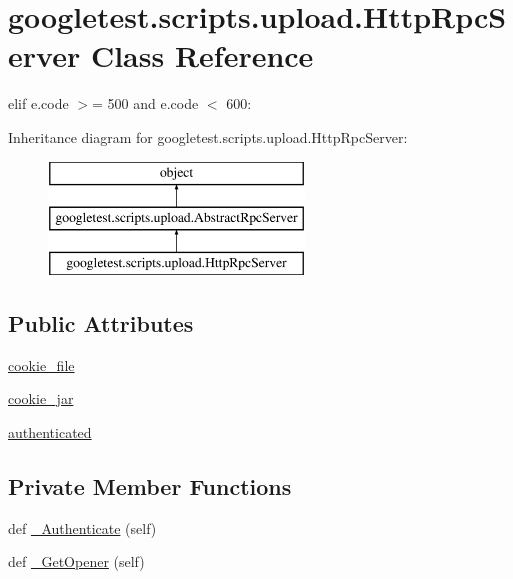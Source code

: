\hypertarget{classgoogletest_1_1scripts_1_1upload_1_1_http_rpc_server}{}\section{googletest.\+scripts.\+upload.\+Http\+Rpc\+Server Class Reference}
\label{classgoogletest_1_1scripts_1_1upload_1_1_http_rpc_server}


elif e.\+code $>$= 500 and e.\+code $<$ 600\+:  


Inheritance diagram for googletest.\+scripts.\+upload.\+Http\+Rpc\+Server\+:\begin{figure}[H]
\begin{center}
\leavevmode
\includegraphics[height=3.000000cm]{d7/d25/classgoogletest_1_1scripts_1_1upload_1_1_http_rpc_server}
\end{center}
\end{figure}
\subsection*{Public Attributes}
\begin{DoxyCompactItemize}
\item 
\mbox{\hyperlink{classgoogletest_1_1scripts_1_1upload_1_1_http_rpc_server_a93d79871cecd4e0e28c55434ca0a2ec3}{cookie\+\_\+file}}
\item 
\mbox{\hyperlink{classgoogletest_1_1scripts_1_1upload_1_1_http_rpc_server_a85d00bef22c50acb5dd6dbb985556b1b}{cookie\+\_\+jar}}
\item 
\mbox{\hyperlink{classgoogletest_1_1scripts_1_1upload_1_1_http_rpc_server_af8b31a303bd2e1d84f3771336cdbeb8e}{authenticated}}
\end{DoxyCompactItemize}
\subsection*{Private Member Functions}
\begin{DoxyCompactItemize}
\item 
def \mbox{\hyperlink{classgoogletest_1_1scripts_1_1upload_1_1_http_rpc_server_a6a2403ba3834ce8b4b9e1c14eb897cfb}{\+\_\+\+Authenticate}} (self)
\item 
def \mbox{\hyperlink{classgoogletest_1_1scripts_1_1upload_1_1_http_rpc_server_aaed250eb0837a8f3b5d7ac5a25faef2e}{\+\_\+\+Get\+Opener}} (self)
\end{DoxyCompactItemize}
